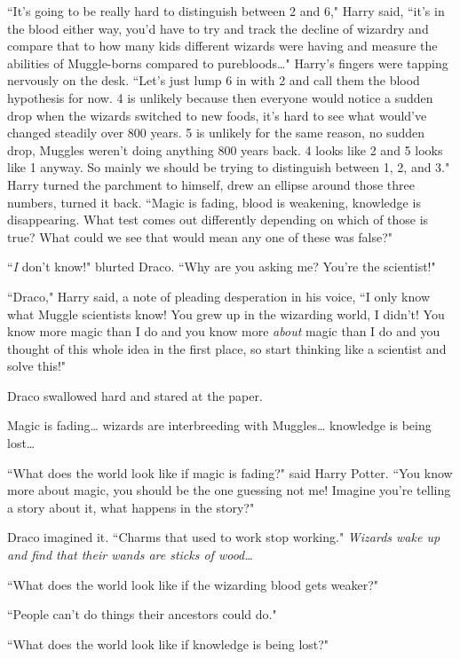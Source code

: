 ``It's going to be really hard to distinguish between 2 and 6," Harry said, ``it's in the blood either way, you'd have to try and track the decline of wizardry and compare that to how many kids different wizards were having and measure the abilities of Muggle-borns compared to purebloods{\ldots}" Harry's fingers were tapping nervously on the desk. ``Let's just lump 6 in with 2 and call them the blood hypothesis for now. 4 is unlikely because then everyone would notice a sudden drop when the wizards switched to new foods, it's hard to see what would've changed steadily over 800 years. 5 is unlikely for the same reason, no sudden drop, Muggles weren't doing anything 800 years back. 4 looks like 2 and 5 looks like 1 anyway. So mainly we should be trying to distinguish between 1, 2, and 3." Harry turned the parchment to himself, drew an ellipse around those three numbers, turned it back. ``Magic is fading, blood is weakening, knowledge is disappearing. What test comes out differently depending on which of those is true? What could we see that would mean any one of these was false?"

``\emph{I} don't know!" blurted Draco. ``Why are you asking me? You're the scientist!"

``Draco," Harry said, a note of pleading desperation in his voice, ``I only know what Muggle scientists know! You grew up in the wizarding world, I didn't! You know more magic than I do and you know more \emph{about} magic than I do and you thought of this whole idea in the first place, so start thinking like a scientist and solve this!"

Draco swallowed hard and stared at the paper.

Magic is fading{\ldots} wizards are interbreeding with Muggles{\ldots} knowledge is being lost{\ldots}

``What does the world look like if magic is fading?" said Harry Potter. ``You know more about magic, you should be the one guessing not me! Imagine you're telling a story about it, what happens in the story?"

Draco imagined it. ``Charms that used to work stop working." \emph{Wizards wake up and find that their wands are sticks of wood{\ldots}}

``What does the world look like if the wizarding blood gets weaker?"

``People can't do things their ancestors could do."

``What does the world look like if knowledge is being lost?"

